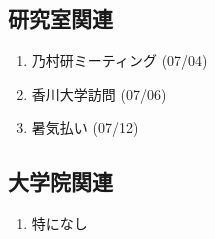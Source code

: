 \documentclass[fleqn, 12pt]{extarticle}
\begin{document}
    \subsection{研究室関連}
    \label{sec-4-2}

    \begin{enumerate}

        \item 乃村研ミーティング
            \hfill
            \label{enum-18}
            (07/04)

        \item 香川大学訪問
            \hfill
            \label{enum-18}
            (07/06)

        \item 暑気払い
            \hfill
            \label{enum-18}
            (07/12)

    \end{enumerate}

    \subsection{大学院関連}
    \begin{enumerate}

        \item 特になし
            \hfill
            \label{enum-17}

    \end{enumerate}

    
\end{document}
